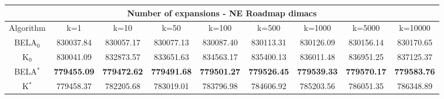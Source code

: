 \begin{tabular}{c|cccccccc}\toprule
\multicolumn{9}{c}{Number of expansions - NE Roadmap dimacs}\\ \midrule
Algorithm & k=1 & k=10 & k=50 & k=100 & k=500 & k=1000 & k=5000 & k=10000 \\ \midrule
BELA$_0$ & 830037.84 & 830057.17 & 830077.13 & 830087.40 & 830113.31 & 830126.09 & 830156.14 & 830170.65 \\
K$_0$ & 830041.09 & 832873.57 & 833651.63 & 834563.17 & 835400.13 & 836011.48 & 836951.25 & 837125.37 \\
BELA$^*$ & \textbf{779455.09} & \textbf{779472.62} & \textbf{779491.68} & \textbf{779501.27} & \textbf{779526.45} & \textbf{779539.33} & \textbf{779570.17} & \textbf{779583.76} \\
K$^*$ & 779458.37 & 782205.68 & 783019.01 & 783796.98 & 784606.92 & 785203.56 & 786051.35 & 786348.89 \\ \bottomrule 
\end{tabular}
